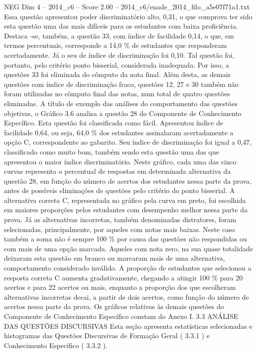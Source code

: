 \begin{textsample}{NEG Dim 4 – 2014\_c6 – Score 2.00 – 2014\_c6/enade\_2014\_filo\_a5e07f71a1.txt}
Essa questão apresentou poder discriminatório alto, 0,31, o que comprova ter sido esta questão uma das mais difíceis para os estudantes com baixa proficiência.
Destaca -se, também, a questão 33, com índice de facilidade 0,14, o que, em termos percentuais, corresponde a 14,0 \% de estudantes que responderam acertadamente.
Já o seu de índice de discriminação foi 0,10.
Tal questão foi, portanto, pelo critério ponto bisserial, considerada inadequada.
Por isso, a questões 33 foi eliminada do cômputo da nota final.
Além desta, as demais questões com índice de discriminação fraco, questões 12, 27 e 30 também não foram utilizadas no cômputo final das notas, num total de quatro questões eliminadas.
A título de exemplo das análises do comportamento das questões objetivas, o Gráfico 3.6 analisa a questão 28 do Componente de Conhecimento Específico.
Esta questão foi classificada como fácil.
Apresentou índice de facilidade 0,64, ou seja, 64,0 \% dos estudantes assinalaram acertadamente a opção C, correspondente ao gabarito.
Seu índice de discriminação foi igual a 0,47, classificado como muito bom, também sendo esta questão uma das que apresentou o maior índice discriminatório.
Neste gráfico, cada uma das cinco curvas representa o percentual de respostas em determinada alternativa da questão 28, em função do número de acertos dos estudantes nessa parte da prova, antes de possíveis eliminações de questões pelo critério do ponto bisserial.
A alternativa correta C, representada no gráfico pela curva em preto, foi escolhida em maiores proporções pelos estudantes com desempenho melhor nessa parte da prova.
Já as alternativas incorretas, também denominadas distratores, foram selecionadas, principalmente, por aqueles com notas mais baixas.
Neste caso também a soma não é sempre 100 \% por causa das questões não respondidas ou com mais de uma opção marcada.
Aqueles com nota zero, na sua quase totalidade deixaram esta questão em branco ou marcaram mais de uma alternativa, comportamento considerado inválido.
A proporção de estudantes que selecionou a resposta correta C aumenta gradativamente, chegando a atingir 100 \% para 20 acertos e para 22 acertos ou mais, enquanto a proporção dos que escolheram alternativas incorretas decai, a partir de dois acertos, como função do número de acertos nessa parte da prova.
Os gráficos relativos às demais questões do Componente de Conhecimento Específico constam do Anexo I. 3.3 ANÁLISE DAS QUESTÕES DISCURSIVAS Esta seção apresenta estatísticas selecionadas e histogramas das Questões Discursivas de Formação Geral ( 3.3.1 ) e Conhecimento Específico ( 3.3.2 ).

\end{textsample}
